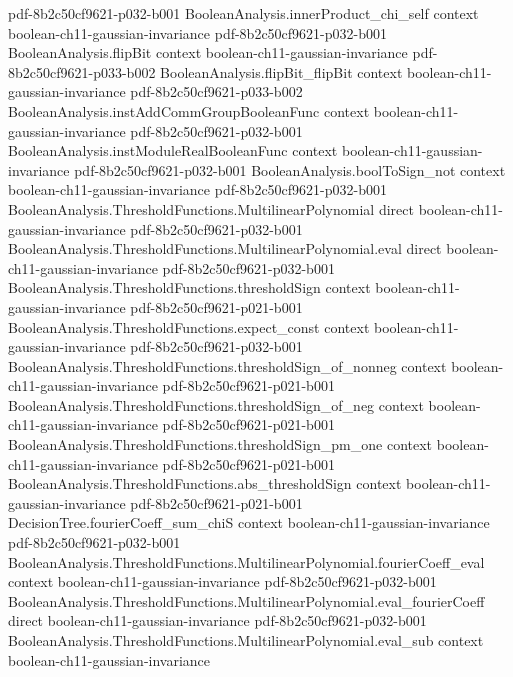 \begin{lemma}
  {pdf-8b2c50cf9621-p032-b001}
\proofstep
  {BooleanAnalysis.innerProduct_chi_self}
  {context}
  {boolean-ch11-gaussian-invariance}
  {pdf-8b2c50cf9621-p032-b001}
\proofstep
  {BooleanAnalysis.flipBit}
  {context}
  {boolean-ch11-gaussian-invariance}
  {pdf-8b2c50cf9621-p033-b002}
\proofstep
  {BooleanAnalysis.flipBit_flipBit}
  {context}
  {boolean-ch11-gaussian-invariance}
  {pdf-8b2c50cf9621-p033-b002}
\proofstep
  {BooleanAnalysis.instAddCommGroupBooleanFunc}
  {context}
  {boolean-ch11-gaussian-invariance}
  {pdf-8b2c50cf9621-p032-b001}
\proofstep
  {BooleanAnalysis.instModuleRealBooleanFunc}
  {context}
  {boolean-ch11-gaussian-invariance}
  {pdf-8b2c50cf9621-p032-b001}
\proofstep
  {BooleanAnalysis.boolToSign_not}
  {context}
  {boolean-ch11-gaussian-invariance}
  {pdf-8b2c50cf9621-p032-b001}
\proofstep
  {BooleanAnalysis.ThresholdFunctions.MultilinearPolynomial}
  {direct}
  {boolean-ch11-gaussian-invariance}
  {pdf-8b2c50cf9621-p032-b001}
\proofstep
  {BooleanAnalysis.ThresholdFunctions.MultilinearPolynomial.eval}
  {direct}
  {boolean-ch11-gaussian-invariance}
  {pdf-8b2c50cf9621-p032-b001}
\proofstep
  {BooleanAnalysis.ThresholdFunctions.thresholdSign}
  {context}
  {boolean-ch11-gaussian-invariance}
  {pdf-8b2c50cf9621-p021-b001}
\proofstep
  {BooleanAnalysis.ThresholdFunctions.expect_const}
  {context}
  {boolean-ch11-gaussian-invariance}
  {pdf-8b2c50cf9621-p032-b001}
\proofstep
  {BooleanAnalysis.ThresholdFunctions.thresholdSign_of_nonneg}
  {context}
  {boolean-ch11-gaussian-invariance}
  {pdf-8b2c50cf9621-p021-b001}
\proofstep
  {BooleanAnalysis.ThresholdFunctions.thresholdSign_of_neg}
  {context}
  {boolean-ch11-gaussian-invariance}
  {pdf-8b2c50cf9621-p021-b001}
\proofstep
  {BooleanAnalysis.ThresholdFunctions.thresholdSign_pm_one}
  {context}
  {boolean-ch11-gaussian-invariance}
  {pdf-8b2c50cf9621-p021-b001}
\proofstep
  {BooleanAnalysis.ThresholdFunctions.abs_thresholdSign}
  {context}
  {boolean-ch11-gaussian-invariance}
  {pdf-8b2c50cf9621-p021-b001}
\proofstep
  {DecisionTree.fourierCoeff_sum_chiS}
  {context}
  {boolean-ch11-gaussian-invariance}
  {pdf-8b2c50cf9621-p032-b001}
\proofstep
  {BooleanAnalysis.ThresholdFunctions.MultilinearPolynomial.fourierCoeff_eval}
  {context}
  {boolean-ch11-gaussian-invariance}
  {pdf-8b2c50cf9621-p032-b001}
\proofstep
  {BooleanAnalysis.ThresholdFunctions.MultilinearPolynomial.eval_fourierCoeff}
  {direct}
  {boolean-ch11-gaussian-invariance}
  {pdf-8b2c50cf9621-p032-b001}
\proofstep
  {BooleanAnalysis.ThresholdFunctions.MultilinearPolynomial.eval_sub}
  {context}
  {boolean-ch11-gaussian-invariance}

\end{lemma}
